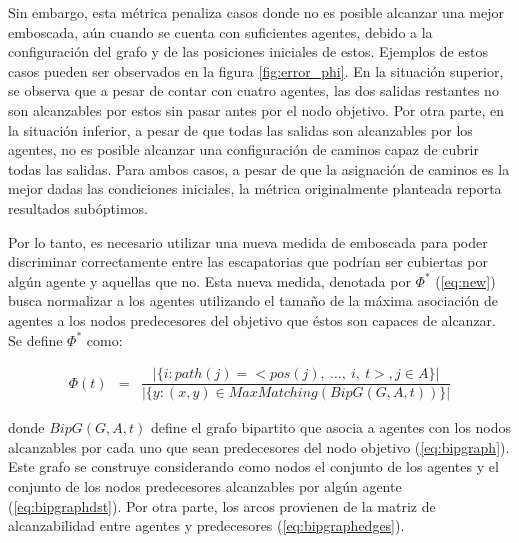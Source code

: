 

Sin embargo, esta m\'etrica penaliza casos donde no es posible alcanzar
una mejor emboscada, a\'un cuando se cuenta con suficientes agentes, debido
a la configuraci\'on del grafo y de las posiciones iniciales de estos. 
Ejemplos de estos casos pueden ser observados en la figura \ref{fig:error_phi}. En
la situaci\'on superior, se observa que a pesar de contar con cuatro agentes,
las dos salidas restantes no son alcanzables por estos sin pasar antes por el
nodo objetivo. Por otra parte, en la situaci\'on inferior, a pesar de que todas
las salidas son alcanzables por los agentes, no es posible alcanzar una
configuraci\'on de caminos capaz de cubrir todas las salidas. Para ambos
casos, a pesar de que la asignaci\'on de caminos es la mejor dadas las
condiciones iniciales, la m\'etrica originalmente planteada reporta resultados
sub\'optimos.



Por lo tanto, es necesario utilizar una nueva medida de emboscada
para poder discriminar correctamente entre las escapatorias que podr\'ian
ser cubiertas por alg\'un agente y aquellas que no. Esta nueva medida,
denotada por $\Phi^*$ (\ref{eq:new}) busca normalizar a los agentes utilizando
el tamaño de la m\'axima asociaci\'on de agentes a los nodos predecesores
del objetivo que \'estos son capaces de alcanzar. Se define $\Phi^*$ como:

\begin{small}
\begin{eqnarray}
 \Phi(t) &=& 
\dfrac{|\{ i : path(j) = <pos(j),\ \ldots,\ i,\ t>, j \in A\}|}
	  {|\{ y : (x,y) \in MaxMatching(BipG(G,A,t))\}|}
\label{eq:new}
\end{eqnarray}
\end{small}

\noindent
donde $BipG(G,A,t)$ define el grafo bipartito que asocia a agentes con
los nodos alcanzables por cada uno que sean predecesores del nodo objetivo
(\ref{eq:bipgraph}).
Este grafo se construye considerando como nodos el conjunto
de los agentes y el conjunto de los nodos predecesores alcanzables por alg\'un
agente (\ref{eq:bipgraphdst}). Por otra parte, los arcos provienen
de la matriz de alcanzabilidad entre agentes y predecesores (\ref{eq:bipgraphedges}).

